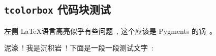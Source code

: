 \begin{multicols*}{2}
\section{\texttt{tcolorbox} 代码块测试}





左侧 \LaTeX 语言高亮似乎有些问题\ , 这个应该是 Pygments 的锅\ 。






\setlength{\parindent}{0pt}

泥濠\ ! 我是沉积岩\ ! 下面是一段一段测试文字\ : %
\codeinline*\Syntax{haskell}{lst = [x| x <- }
\codeinline\Syntax{haskell}{['a'..'g']] -- by 沉积岩}

\end{multicols*}